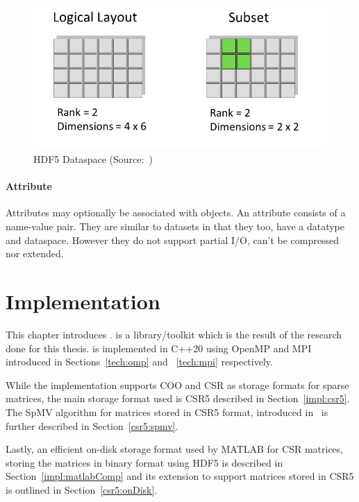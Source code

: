 \documentclass[thesis=M,english]{FITthesis}[2019/12/23]
\begin{document}
\begin{figure}[H]
    \centering
    \includegraphics[scale=0.3]{static/dataspace.png}
    \caption{HDF5 Dataspace (Source:~\cite{hdf5})}
\end{figure}



\subsubsection{Attribute}

Attributes may optionally be associated with objects. An attribute consists of a name-value pair.
They are similar to datasets in that they too, have a datatype and dataspace. However they do not
support partial I/O, can't be compressed nor extended.



\chapter{Implementation}

This chapter introduces .  is a library/toolkit which is the result of the research done for this
thesis.  is implemented in C++20 using OpenMP and MPI introduced in Sections~\ref{tech:omp} and
~\ref{tech:mpi} respectively.

While the implementation supports COO and CSR as storage formats for sparse matrices, the main storage
format used is CSR5 described in Section~\ref{impl:csr5}. The SpMV algorithm for matrices stored in CSR5
format, introduced in~\cite{liu2015csr5} is further described in Section~\ref{csr5:spmv}.

Lastly, an efficient on-disk storage format used by MATLAB for CSR matrices, storing the matrices in
binary format using HDF5 is described in Section~\ref{impl:matlabComp} and its extension to support
matrices stored in CSR5 is outlined in Section~\ref{csr5:onDisk}.
\end{document}
